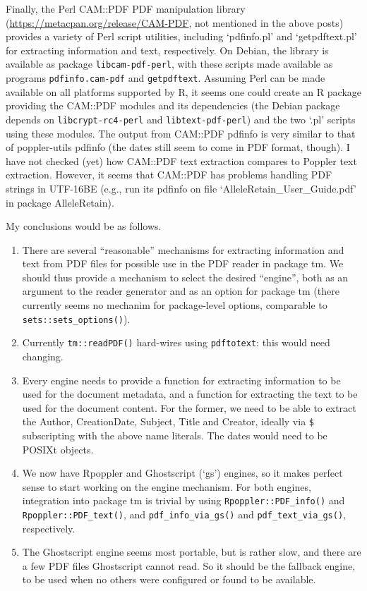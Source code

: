 \documentclass[a4paper]{article}
\newcommand{\file}[1]{`\textsf{#1}'}
\newcommand{\strong}[1]{{\normalfont\fontseries{b}\selectfont #1}}
\let\pkg=\strong
\begin{document}
Finally, the Perl CAM::PDF PDF manipulation library
(\url{https://metacpan.org/release/CAM-PDF}, not mentioned in the above
posts) provides a variety of Perl script utilities, including
\file{pdfinfo.pl} and \file{getpdftext.pl} for extracting information
and text, respectively.  On Debian, the library is available as package
\verb|libcam-pdf-perl|, with these scripts made available as programs
\verb|pdfinfo.cam-pdf| and \verb|getpdftext|.  Assuming Perl can be made
available on all platforms supported by R, it seems one could create an
R package providing the CAM::PDF modules and its dependencies (the
Debian package depends on \verb|libcrypt-rc4-perl| and
\verb|libtext-pdf-perl|) and the two \file{.pl} scripts using these
modules.  The output from CAM::PDF pdfinfo is very similar to that of
poppler-utils pdfinfo (the dates still seem to come in PDF format,
though).  I have not checked (yet) how CAM::PDF text extraction compares
to Poppler text extraction.  However, it seems that CAM::PDF has
problems handling PDF strings in UTF-16BE (e.g., run its pdfinfo on file
\file{AlleleRetain\_User\_Guide.pdf} in package \pkg{AlleleRetain}).

My conclusions would be as follows.
\begin{enumerate}
 \item There are several ``reasonable'' mechanisms for extracting
  information and text from PDF files for possible use in the PDF reader
  in package \pkg{tm}.  We should thus provide a mechanism to select the
  desired ``engine'', both as an argument to the reader generator and as
  an option for package \pkg{tm} (there currently seems no mechanim for
  package-level options, comparable to \verb|sets::sets_options()|).

 \item Currently \verb|tm::readPDF()| hard-wires using \verb|pdftotext|:
  this would need changing.

 \item Every engine needs to provide a function for extracting
  information to be used for the document metadata, and a function for
  extracting the text to be used for the document content.  For the
  former, we need to be able to extract the Author, CreationDate,
  Subject, Title and Creator, ideally via \verb|$| subscripting with the
  above name literals.  The dates would need to be POSIXt objects.

 \item We now have Rpoppler and Ghostscript (`gs') engines, so it makes
  perfect sense to start working on the engine mechanism.  For both
  engines, integration into package \pkg{tm} is trivial by using
  \verb|Rpoppler::PDF_info()| and \verb|Rpoppler::PDF_text()|, and
  \verb|pdf_info_via_gs()| and \verb|pdf_text_via_gs()|, respectively.

 \item The Ghostscript engine seems most portable, but is rather slow,
  and there are a few PDF files Ghostscript cannot read.  So it should
  be the fallback engine, to be used when no others were configured or
  found to be available.
\end{enumerate}
\end{document}
